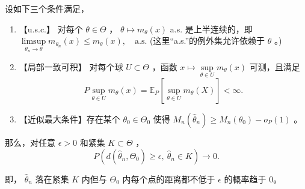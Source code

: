\begin{theorem}\label{thm:ch9:wald-consistency}

设如下三个条件满足，

\begin{enumerate}
\def\labelenumi{\arabic{enumi}.}
\tightlist
\item
  【u.s.c.】 对每个 $\theta\in\Theta$ ， $\theta\mapsto m_\theta(x)$ a.s. 是上半连续的，即 $\limsup\limits_{\theta_n\to\theta}m_{\theta_n}(x)\le m_\theta(x),\quad \text{a.s.}$ (这里``a.s.''的例外集允许依赖于 $\theta$ 。)
\item
  【局部一致可积】 对每个球 $U\subset\Theta$ ，函数 $x\mapsto \sup\limits_{\theta\in U}m_\theta(x)$ 可测，且满足
  \[
  P\sup_{\theta\in U}m_\theta(x)=\mathbb E_P\left[\sup_{\theta\in U}m_\theta(X)\right]<\infty.
  \]
\item
  【近似最大条件】存在某个 $\theta_0\in\Theta_0$ 使得 $M_n(\widehat\theta_n)\ge M_n(\theta_0)-o_P(1)$ 。
\end{enumerate}

那么，对任意 $\epsilon>0$ 和紧集 $K\subset\Theta$ ，
\[
P(d(\widehat\theta_n,\Theta_0)\ge\epsilon,\ \widehat\theta_n\in K)\to 0.
\]

即， $\widehat\theta_n$ 落在紧集 $K$ 内但与 $\Theta_0$ 内每个点的距离都不低于 $\epsilon$ 的概率趋于 0。

\end{theorem}

